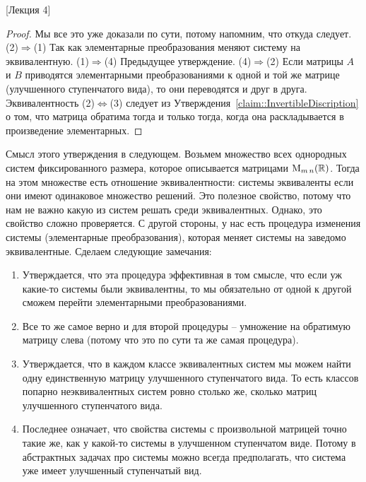 [Лекция 4]


\begin{proof}
Мы все это уже доказали по сути, потому напомним, что откуда следует.
(2)$\Rightarrow$(1) Так как элементарные преобразования меняют систему на эквивалентную.
(1)$\Rightarrow$(4)  Предыдущее утверждение.
(4)$\Rightarrow$(2) Если матрицы $A$ и $B$ приводятся элементарными преобразованиями к одной и той же матрице (улучшенного ступенчатого вида), то они переводятся и друг в друга.
Эквивалентность (2)$\Leftrightarrow$(3) следует из Утверждения~\ref{claim::InvertibleDiscription} о том, что матрица обратима тогда и только тогда, когда она раскладывается в произведение элементарных.
\end{proof}

Смысл этого утверждения в следующем.
Возьмем множество всех однородных систем фиксированного размера, которое описывается матрицами $\operatorname{M}_{m\,n}(\mathbb R)$.
Тогда на этом множестве есть отношение эквивалентности: системы эквиваленты если они имеют одинаковое множество решений.
Это полезное свойство, потому что нам не важно какую из систем решать среди эквивалентных.
Однако, это свойство сложно проверяется.
С другой стороны, у нас есть процедура изменения системы (элементарные преобразования), которая меняет системы на заведомо эквивалентные.
Сделаем следующие замечания:
\begin{enumerate}
\item Утверждается, что эта процедура эффективная в том смысле, что если уж какие-то системы были эквивалентны, то мы обязательно от одной к другой сможем перейти элементарными преобразованиями.

\item Все то же самое верно и для второй процедуры -- умножение на обратимую матрицу слева (потому что это по сути та же самая процедура).

\item Утверждается, что в каждом классе эквивалентных систем мы можем найти одну единственную матрицу улучшенного ступенчатого вида.
То есть классов попарно неэквивалентных систем ровно столько же, сколько матриц улучшенного ступенчатого вида.

\item Последнее означает, что свойства системы с произвольной матрицей точно такие же, как у какой-то системы в улучшенном ступенчатом виде.
Потому в абстрактных задачах про системы можно всегда предполагать, что система уже имеет улучшенный ступенчатый вид.
\end{enumerate}

